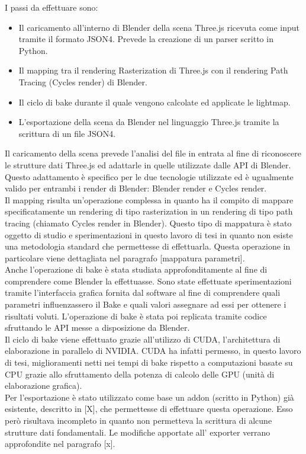 I passi da effettuare sono:
\begin{itemize}
\item Il caricamento all’interno di Blender della scena Three.js ricevuta come input tramite il formato JSON4. Prevede la creazione di un parser scritto in Python.
\item Il mapping tra il rendering Rasterization di Three.js con il rendering Path Tracing (Cycles render) di Blender.
\item Il ciclo di bake durante il quale vengono calcolate ed applicate le lightmap.
\item L’esportazione della scena da Blender nel linguaggio Three.js tramite la scrittura di un file JSON4.
\end{itemize}

Il caricamento della scena prevede l’analisi del file in entrata al fine di riconoscere le strutture dati Three.js ed adattarle in quelle utilizzate dalle API di Blender.
Questo adattamento è specifico per le due tecnologie utilizzate ed è ugualmente valido per entrambi i render di Blender: Blender render e Cycles render.
\\
Il mapping risulta un’operazione complessa in quanto ha il compito di mappare specificatamente un rendering di tipo rasterization in un rendering di tipo path tracing (chiamato Cycles render in Blender).
Questo tipo di mappatura è stato oggetto di studio e sperimentazioni in questo lavoro di tesi in quanto non esiste una metodologia standard che permettesse di effettuarla. Questa operazione in particolare viene dettagliata nel paragrafo [mappatura parametri].
\\
Anche l’operazione di bake è stata studiata approfonditamente al fine di comprendere come Blender la effettuasse. Sono state effettuate sperimentazioni tramite l’interfaccia grafica fornita dal software al fine di comprendere quali parametri influenzassero il Bake e quali valori assegnare ad essi per ottenere i risultati voluti. L’operazione di bake è stata poi replicata tramite codice sfruttando le API messe a disposizione da Blender.
\\
Il ciclo di bake viene effettuato grazie all’utilizzo di CUDA, l'architettura di elaborazione in parallelo di NVIDIA. 
CUDA ha infatti permesso, in questo lavoro di tesi, miglioramenti netti nei tempi di bake rispetto a computazioni basate su CPU grazie allo sfruttamento della potenza di calcolo delle GPU (unità di elaborazione grafica).
\\
Per l’esportazione è stato utilizzato come base un addon (scritto in Python) già esistente, descritto in [X], che permettesse di effettuare questa operazione. Esso però risultava incompleto in quanto non permetteva la scrittura di alcune strutture dati fondamentali. Le modifiche apportate all’ exporter verrano approfondite nel paragrafo [x].

